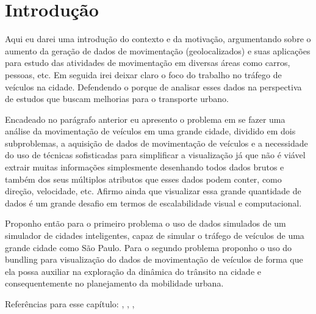 \chapter{Introdução}
\label{cap:introducao}

Aqui eu darei uma introdução do contexto e da motivação, argumentando sobre o
aumento da geração de dados de movimentação (geolocalizados) e suas aplicações
para estudo das atividades de movimentação em diversas áreas como carros,
pessoas, etc. Em seguida irei deixar claro o foco do trabalho no tráfego de
veículos na cidade. Defendendo o porque de analisar esses dados na perspectiva
de estudos que buscam melhorias para o transporte urbano. 

Encadeado no parágrafo anterior eu apresento o problema em se fazer uma análise
da movimentação de veículos em uma grande cidade, dividido em dois
subproblemas, a aquisição de dados de movimentação de veículos e a necessidade
do uso de técnicas sofisticadas para simplificar a visualização já que não é
viável extrair muitas informações simplesmente desenhando todos dados brutos e
também dos seus múltiplos atributos que esses dados podem conter, como direção,
velocidade, etc.  Afirmo ainda que visualizar essa grande quantidade de dados é
um grande desafio em termos de escalabilidade visual e computacional.

Proponho então para o primeiro problema o uso de dados simulados de um
simulador de cidades inteligentes, capaz de simular o tráfego de veículos de
uma grande cidade como São Paulo. Para o segundo problema proponho o uso do
bundling para visualização do dados de movimentação de veículos de
forma que ela possa auxiliar na exploração da dinâmica do trânsito na cidade e
consequentemente no planejamento da mobilidade urbana.

Referências para esse capítulo: \cite{Andrienko2011}, \cite{Liu2013},
\cite{Hurter2013}, \cite{Zhou2013}
